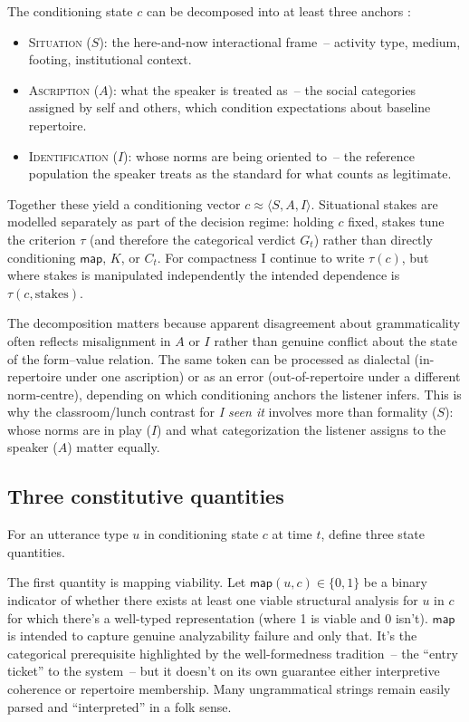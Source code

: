 \documentclass[12pt,letterpaper]{article}
\newcommand{\mention}[1]{\textit{#1}}
\begin{document}
The conditioning state $c$ can be decomposed into at least three anchors \autocite{reynolds2026varieties}:
\begin{itemize}
\item \textsc{Situation} ($S$): the here-and-now interactional frame~-- activity type, medium, footing, institutional context.
\item \textsc{Ascription} ($A$): what the speaker is treated as~-- the social categories assigned by self and others, which condition expectations about baseline repertoire.
\item \textsc{Identification} ($I$): whose norms are being oriented to~-- the reference population the speaker treats as the standard for what counts as legitimate.
\end{itemize}
Together these yield a conditioning vector $c\approx\langle S,A,I\rangle$. Situational stakes are modelled separately as part of the decision regime: holding $c$ fixed, stakes tune the criterion $\tau$ (and therefore the categorical verdict $G_t$) rather than directly conditioning $\mathsf{map}$, $K$, or $C_t$. For compactness I continue to write $\tau(c)$, but where stakes is manipulated independently the intended dependence is $\tau(c,\text{stakes})$.

The decomposition matters because apparent disagreement about grammaticality often reflects misalignment in $A$ or $I$ rather than genuine conflict about the state of the form--value relation. The same token can be processed as dialectal (in-repertoire under one ascription) or as an error (out-of-repertoire under a different norm-centre), depending on which conditioning anchors the listener infers. This is why the classroom/lunch contrast for \mention{I seen it} involves more than formality ($S$): whose norms are in play ($I$) and what categorization the listener assigns to the speaker ($A$) matter equally.

\subsection{Three constitutive quantities}\label{sec:quantities}

For an utterance type $u$ in conditioning state $c$ at time $t$, define three state quantities.

The first quantity is mapping viability. Let $\mathsf{map}(u,c)\in\{0,1\}$ be a binary indicator of whether there exists at least one viable structural analysis for $u$ in $c$ for which there's a well-typed representation (where 1 is viable and 0 isn't). $\mathsf{map}$ is intended to capture genuine analyzability failure and only that. It's the categorical prerequisite highlighted by the well-formedness tradition~-- the \enquote{entry ticket} to the system~-- but it doesn't on its own guarantee either interpretive coherence or repertoire membership. Many ungrammatical strings remain easily parsed and \enquote{interpreted} in a folk sense.
\end{document}
